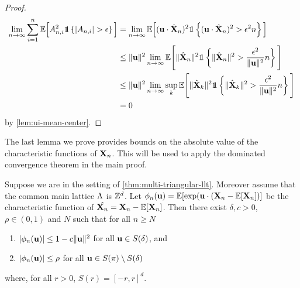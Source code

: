 \begin{proof}
\begin{align*}
        \lim_{n \to \infty} \sum_{i=1}^n \E\Big[A_{n, i}^2 \one\left\{ \abs{A_{n, i}} > \epsilon \right\}\Big]
        &= \lim_{n \to \infty} \E\Big[ (\vu \cdot \hat{\vX}_n)^2 \one\left\{ (\vu \cdot \hat{\vX}_n)^2 > \epsilon^2 n \right\}\Big] \\
        &\leq \norm{\vu}^2 \lim_{n \to \infty} \E\Bigg[ \norm{\hat{\vX}_n}^2 \one\left\{ \norm{\hat{\vX}_n}^2 > \frac{\epsilon^2}{\norm{\vu}^2} n \right\}\Bigg] \\
        &\leq \norm{\vu}^2 \lim_{n \to \infty} \sup_k \E\Bigg[ \norm{\hat{\vX}_k}^2 \one\left\{ \norm{\hat{\vX}_k}^2 > \frac{\epsilon^2}{\norm{\vu}^2} n \right\}\Bigg] \\
        &= 0
    \end{align*}
    by \cref{lem:ui-mean-center}.
\end{proof}

The last lemma we prove provides bounds on the absolute value of the characteristic functions of ${\mathbf X}_n$. This will be used to apply the dominated convergence theorem in the main proof.
\begin{lemma}
    \label{lem:dom-cf}
    Suppose we are in the setting of \cref{thm:multi-triangular-llt}. Moreover assume that the common main lattice $\Lambda$ is ${\mathbb Z}^d$. Let $\phi_n({\mathbf u}) = {\mathbb E}[\exp({\mathbf u} \cdot ({\mathbf X}_n - {\mathbb E}[{\mathbf X}_n])]$ be the characteristic function of $\hat{{\mathbf X}_n} = {\mathbf X}_n - {\mathbb E}[{\mathbf X}_n]$. Then there exist $\delta, c> 0$, $\rho \in (0, 1)$ and $N$ such that for all $n \geq N$
    \begin{enumerate}
        \item $\lvert\phi_n({\mathbf u})\rvert \leq 1 - c \lVert{\mathbf u}\rVert^2$ for all ${\mathbf u} \in S(\delta)$, and
        \item $\lvert\phi_n({\mathbf u})\rvert \leq \rho$ for all ${\mathbf u} \in S(\pi) \setminus S(\delta)$
    \end{enumerate}
    where, for all $r > 0$, $S(r) = [-r, r]^d$.
\end{lemma}

